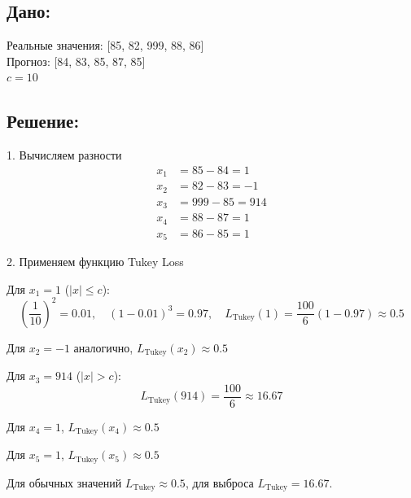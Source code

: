 \subsection*{Дано:}
Реальные значения: [85, 82, 999, 88, 86] \\
Прогноз: [84, 83, 85, 87, 85] \\
$c = 10$

\subsection*{Решение:}

1. Вычисляем разности
\begin{align*}
    x_1 & = 85 - 84 = 1    \\
    x_2 & = 82 - 83 = -1   \\
    x_3 & = 999 - 85 = 914 \\
    x_4 & = 88 - 87 = 1    \\
    x_5 & = 86 - 85 = 1
\end{align*}

2. Применяем функцию Tukey Loss

Для $x_1 = 1$ ($|x| \leq c$):
\[
    \left(\frac{1}{10}\right)^2 = 0.01, \quad (1 - 0.01)^3 = 0.97, \quad L_{\text{Tukey}}(1) = \frac{100}{6}(1 - 0.97) \approx 0.5
\]

Для $x_2 = -1$ аналогично, $L_{\text{Tukey}}(x_2) \approx 0.5$

Для $x_3 = 914$ ($|x| > c$):
\[
    L_{\text{Tukey}}(914) = \frac{100}{6} \approx 16.67
\]

Для $x_4 = 1$, $L_{\text{Tukey}}(x_4) \approx 0.5$

Для $x_5 = 1$, $L_{\text{Tukey}}(x_5) \approx 0.5$

Для обычных значений $L_{\text{Tukey}} \approx 0.5$, для выброса $L_{\text{Tukey}} = 16.67$.
